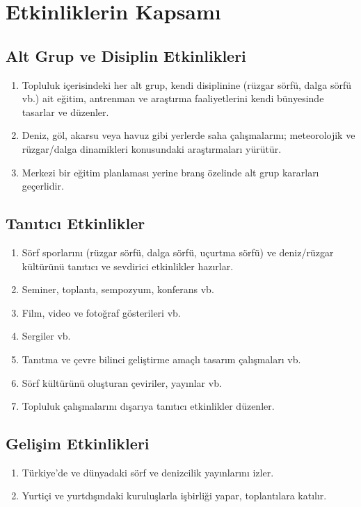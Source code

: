 \documentclass[11pt,a4paper]{article}
\begin{document}
\section{Etkinliklerin Kapsamı}

\subsection{Alt Grup ve Disiplin Etkinlikleri}
\begin{enumerate}
    \item Topluluk içerisindeki her alt grup, kendi disiplinine (rüzgar sörfü, dalga sörfü vb.) ait eğitim, antrenman ve araştırma faaliyetlerini kendi bünyesinde tasarlar ve düzenler.
    \item Deniz, göl, akarsu veya havuz gibi yerlerde saha çalışmalarını; meteorolojik ve rüzgar/dalga dinamikleri konusundaki araştırmaları yürütür.
    \item Merkezi bir eğitim planlaması yerine branş özelinde alt grup kararları geçerlidir.
\end{enumerate}

\subsection{Tanıtıcı Etkinlikler}
\begin{enumerate}
    \item Sörf sporlarını (rüzgar sörfü, dalga sörfü, uçurtma sörfü) ve deniz/rüzgar kültürünü tanıtıcı ve sevdirici etkinlikler hazırlar.
    \item Seminer, toplantı, sempozyum, konferans vb.
    \item Film, video ve fotoğraf gösterileri vb.
    \item Sergiler vb.
    \item Tanıtma ve çevre bilinci geliştirme amaçlı tasarım çalışmaları vb.
    \item Sörf kültürünü oluşturan çeviriler, yayınlar vb.
    \item Topluluk çalışmalarını dışarıya tanıtıcı etkinlikler düzenler.
\end{enumerate}

\subsection{Gelişim Etkinlikleri}
\begin{enumerate}
    \item Türkiye’de ve dünyadaki sörf ve denizcilik yayınlarını izler.
    \item Yurtiçi ve yurtdışındaki kuruluşlarla işbirliği yapar, toplantılara katılır.
\end{enumerate}
\end{document}
